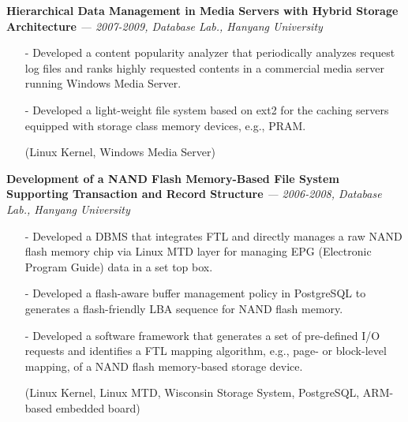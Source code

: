   \vspace{-0.15in}
  {\bf Hierarchical Data Management in Media Servers with Hybrid Storage Architecture}
    {\it \footnotesize --- 2007-2009, Database Lab., Hanyang University}
    \begin{itemize}[leftmargin=*]
    \setlength\itemsep{-0.02in}
    \item[-] Developed a content popularity analyzer that periodically analyzes 
             request log files and ranks highly requested contents
             in a commercial media server running Windows Media Server.
    \item[-] Developed a light-weight file system based on ext2
             for the caching servers equipped with 
             storage class memory devices, e.g., PRAM.
    \item[] {\small(Linux Kernel, Windows Media Server)}
    \end{itemize}
  \vspace{-0.15in}
  {\bf Development of a NAND Flash Memory-Based File System Supporting Transaction and
      Record Structure} 
    {\it \footnotesize --- 2006-2008, Database Lab., Hanyang University}
    \begin{itemize}[leftmargin=*]
    \setlength\itemsep{-0.02in}
    \item[-] Developed a DBMS that integrates FTL and directly manages a raw NAND flash
             memory chip via Linux MTD layer for managing EPG (Electronic Program Guide)
             data in a set top box.
    \item[-] Developed a flash-aware buffer management policy in PostgreSQL
             to generates a flash-friendly LBA sequence for NAND flash memory.
    \item[-] Developed a software framework that generates a set of pre-defined I/O requests
	     and identifies a FTL mapping algorithm, e.g., page- or block-level mapping,
             of a NAND flash memory-based
             storage device.
    \item[] {\small(Linux Kernel, Linux MTD, Wisconsin Storage System, PostgreSQL,
             ARM-based embedded board)}
    \end{itemize}

